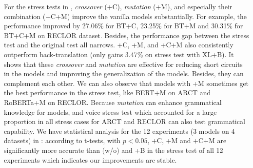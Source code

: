 For the stress tests in ,  \textit{crossover} (+C), \textit{mutation} (+M), 
and especially their combination (+C+M) improve the vanilla models substantially. 
For example, the performance improved by 27.06\% for BT+C, 23.25\% for BT+M and 
30.31\% for BT+C+M on RECLOR dataset. Besides, 
the performance gap between the stress test and the original test all narrows. 
+C, +M, and +C+M also 
consistently outperform back-translation (only gains 3.47\% on stress test with XL+B). 
It shows that these \textit{crossover} and \textit{mutation} are effective for 
reducing short circuits in the models and improving the generalization of the models.
Besides, they can complement each other. 
We can also observe that models with +M sometimes get the best performance in the stress 
test, like BERT+M on ARCT and RoBERTa+M on RECLOR. Because 
\textit{mutation} can enhance grammatical knowledge for models,
and voice stress test which accounted for 
a large proportion in all stress cases 
for ARCT and RECLOR can also test grammatical capability. 
We have statistical analysis for the 12 
experiments (3 models on 4 datasets) in : 
according to t-tests, with $p<0.05$, +C, +M and +C+M are significantly more
accurate than (w/o) and +B in the stress test of all 12 experiments which indicates our improvements are stable. 

